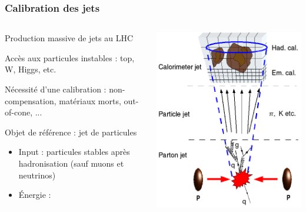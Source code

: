 \begin{frame}
\frametitle{Calibration des jets}
\begin{columns}
\begin{column}{0.7\textwidth}
\begin{maliste}
\item Production massive de jets au LHC
\vspace*{0.2cm}
\item Acc\`es aux particules instables : top, W, Higgs, etc.
\vspace*{0.2cm}
\item Nécessité d'une calibration : non-compensation, matériaux morts, out-of-cone, ...
\vspace*{0.2cm}
\item Objet de référence : jet de particules 
\begin{itemize}
\item Input : particules stables après hadronisation (sauf muons et neutrinos)
\item \'Energie : \Etruth
\end{itemize}
\end{maliste}
\end{column}
\begin{column}{0.35\textwidth}
\includegraphics[width=.9\textwidth]{Figures/JES/jetAtVariousLevelIllustration.png}

\end{column}
\end{columns}
\end{frame}
